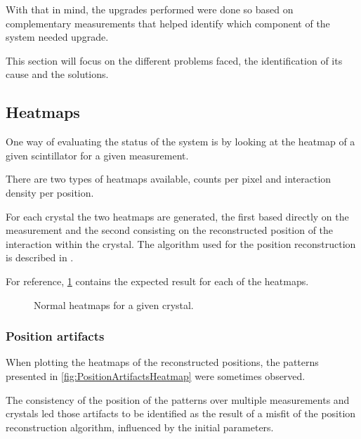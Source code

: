 With that in mind, the upgrades performed were done so based on complementary measurements that helped identify which component of the system needed upgrade.

This section will focus on the different problems faced, the identification of its cause and the solutions.

\subsection{Heatmaps}\label{ssec:heatmaps}

One way of evaluating the status of the system is by looking at the heatmap of a given scintillator for a given measurement.

There are two types of heatmaps available, counts per pixel and interaction density per position.

For each crystal the two heatmaps are generated, the first based directly on the measurement and the second consisting on the reconstructed position of the interaction within the crystal. The algorithm used for the position reconstruction is described in \cite{BABIANO20191, BALIBREACORREA2021165249}.

For reference, \ref{fig:NormalHeadtmap} contains the expected result for each of the heatmaps.

\begin{figure}[h!]
    \centering
    \qquad
    \caption{Normal heatmaps for a given crystal.}%
    \label{fig:NormalHeadtmap}%
\end{figure}

\subsubsection{Position artifacts}

When plotting the heatmaps of the reconstructed positions, the patterns presented in \ref{fig:PositionArtifactsHeatmap} were sometimes observed.

The consistency of the position of the patterns over multiple measurements and crystals led those artifacts to be identified as the result of a misfit of the position reconstruction algorithm, influenced by the initial parameters.

